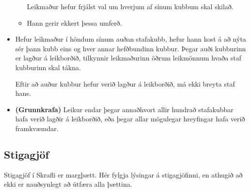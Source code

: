 \documentclass[12pt,a4paper]{article}
\newcommand{\coref}{\textbf{(Grunnkrafa)}}
\begin{document}
\begin{itemize}
\begin{itemize}
		Leikmaður hefur frjálst val um hverjum af sínum kubbum skal skilað.

		\item Hann gerir ekkert þessa umferð.
	\end{itemize}

	\item Hefur leikmaður í höndum sínum auðan stafakubb, hefur hann kost á að nýta sér þann kubb eins og hver annar hefðbundinn kubbur. Þegar auði kubburinn er lagður á leikborðið, tilkynnir leikmaðurinn öðrum leikmönnum hvaða staf kubburinn skal tákna.

	Eftir að auður kubbur hefur verið lagður á leikborðið, má ekki breyta staf hans.

	\item \coref{} Leikur endar þegar annaðhvort allir hundrað stafakubbar hafa verið lagðir á leikborðið, eða þegar allar mögulegar hreyfingar hafa verið framkvæmdar.

\end{itemize}

\subsection*{Stigagjöf}

Stigagjöf í Skrafli er margþætt. Hér fylgja lýsingar á stigagjöfinni, en athugið að ekki er nauðsynlegt að útfæra alla þættina.
\end{document}
